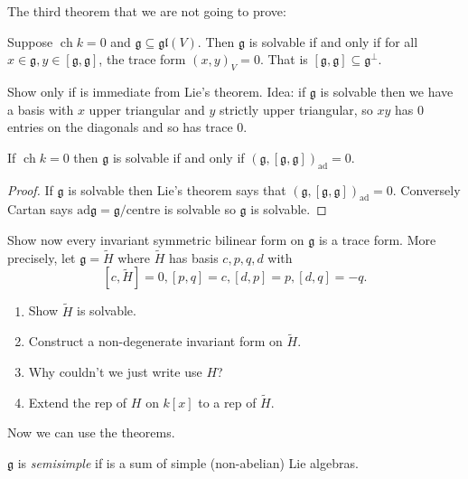 \documentclass[a4paper]{article}
\newcommand*{\Lie}[1]{\mathfrak{#1}} %
\newcommand{\ad}{\mathrm{ad}} %
\DeclareMathOperator{\cha}{ch} %
\begin{document}
The third theorem that we are not going to prove:

\begin{theorem}
  Suppose \(\cha k = 0\) and \(\Lie g \subseteq \Lie{gl}(V)\). Then \(\Lie g\) is solvable if and only if for all \(x \in \Lie g, y \in [\Lie g, \Lie g]\), the trace form \((x, y)_V = 0\). That is \([\Lie g, \Lie g] \subseteq \Lie g^\perp\).
\end{theorem}

\begin{ex}
  Show only if is immediate from Lie's theorem. Idea: if \(\Lie g\) is solvable then we have a basis with \(x\) upper triangular and \(y\) strictly upper triangular, so \(xy\) has \(0\) entries on the diagonals and so has trace \(0\).
\end{ex}

\begin{corollary}
  If \(\cha k = 0\) then \(\Lie g\) is solvable if and only if \((\Lie g, [\Lie g, \Lie g])_{\ad} = 0\).
\end{corollary}

\begin{proof}
  If \(\Lie g\) is solvable then Lie's theorem says that \((\Lie g, [\Lie g, \Lie g])_{\ad} = 0\). Conversely Cartan says \(\ad \Lie g = \Lie g/\text{centre}\) is solvable so \(\Lie g\) is solvable.
\end{proof}

\begin{ex}
  Show now every invariant symmetric bilinear form on \(\Lie g\) is a trace form. More precisely, let \(\Lie g = \tilde H\) where \(\tilde H\) has basis \(c, p, q, d\) with
  \[
    [c, \tilde H] = 0, [p, q] = c, [d, p] = p, [d, q] = -q.
  \]
  \begin{enumerate}
  \item Show \(\tilde H\) is solvable.
  \item Construct a non-degenerate invariant form on \(\tilde H\).
  \item Why couldn't we just write use \(H\)?
  \item Extend the rep of \(H\) on \(k[x]\) to a rep of \(\tilde H\).
  \end{enumerate}
\end{ex}

Now we can use the theorems.

\begin{definition}[semisimplicity]
  \(\Lie g\) is \emph{semisimple} if is a sum of simple (non-abelian) Lie algebras.
\end{definition}
\end{document}
